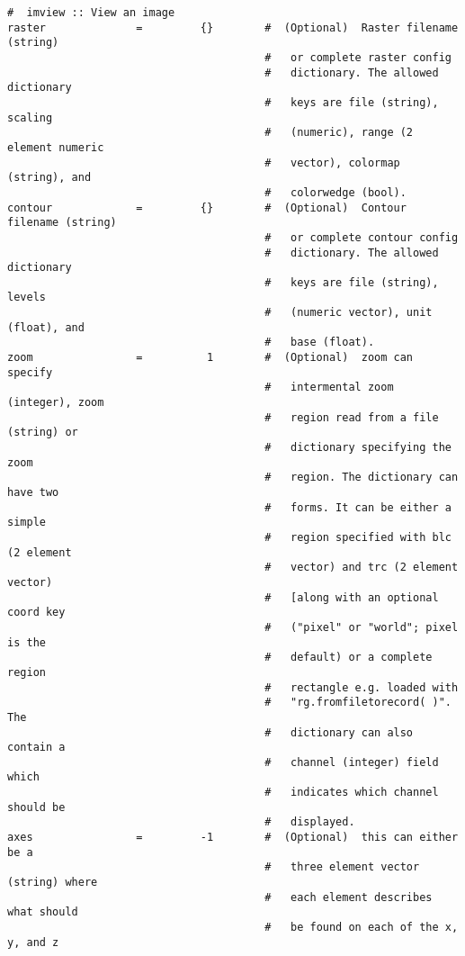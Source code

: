 \small
\begin{verbatim}
#  imview :: View an image
raster              =         {}        #  (Optional)  Raster filename (string)
                                        #   or complete raster config
                                        #   dictionary. The allowed dictionary
                                        #   keys are file (string), scaling
                                        #   (numeric), range (2 element numeric
                                        #   vector), colormap (string), and
                                        #   colorwedge (bool).
contour             =         {}        #  (Optional)  Contour filename (string)
                                        #   or complete contour config
                                        #   dictionary. The allowed dictionary
                                        #   keys are file (string), levels
                                        #   (numeric vector), unit (float), and
                                        #   base (float).
zoom                =          1        #  (Optional)  zoom can specify
                                        #   intermental zoom (integer), zoom
                                        #   region read from a file (string) or
                                        #   dictionary specifying the zoom
                                        #   region. The dictionary can have two
                                        #   forms. It can be either a simple
                                        #   region specified with blc (2 element
                                        #   vector) and trc (2 element vector)
                                        #   [along with an optional coord key
                                        #   ("pixel" or "world"; pixel is the
                                        #   default) or a complete region
                                        #   rectangle e.g. loaded with
                                        #   "rg.fromfiletorecord( )". The
                                        #   dictionary can also contain a
                                        #   channel (integer) field which
                                        #   indicates which channel should be
                                        #   displayed.
axes                =         -1        #  (Optional)  this can either be a
                                        #   three element vector (string) where
                                        #   each element describes what should
                                        #   be found on each of the x, y, and z

\end{verbatim}
